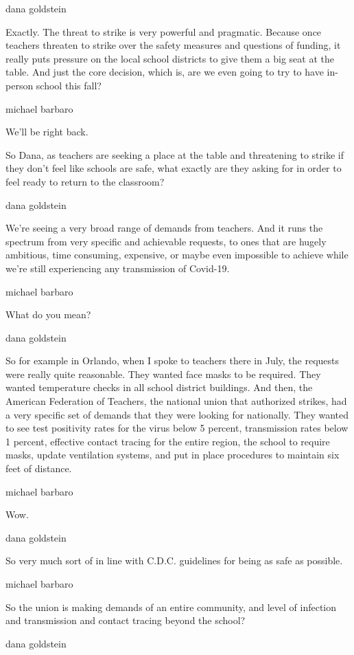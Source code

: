 dana goldstein

Exactly. The threat to strike is very powerful and pragmatic. Because
once teachers threaten to strike over the safety measures and questions
of funding, it really puts pressure on the local school districts to
give them a big seat at the table. And just the core decision, which is,
are we even going to try to have in-person school this fall?

michael barbaro

We'll be right back.

So Dana, as teachers are seeking a place at the table and threatening to
strike if they don't feel like schools are safe, what exactly are they
asking for in order to feel ready to return to the classroom?

dana goldstein

We're seeing a very broad range of demands from teachers. And it runs
the spectrum from very specific and achievable requests, to ones that
are hugely ambitious, time consuming, expensive, or maybe even
impossible to achieve while we're still experiencing any transmission of
Covid-19.

michael barbaro

What do you mean?

dana goldstein

So for example in Orlando, when I spoke to teachers there in July, the
requests were really quite reasonable. They wanted face masks to be
required. They wanted temperature checks in all school district
buildings. And then, the American Federation of Teachers, the national
union that authorized strikes, had a very specific set of demands that
they were looking for nationally. They wanted to see test positivity
rates for the virus below 5 percent, transmission rates below 1 percent,
effective contact tracing for the entire region, the school to require
masks, update ventilation systems, and put in place procedures to
maintain six feet of distance.

michael barbaro

Wow.

dana goldstein

So very much sort of in line with C.D.C. guidelines for being as safe as
possible.

michael barbaro

So the union is making demands of an entire community, and level of
infection and transmission and contact tracing beyond the school?

dana goldstein

